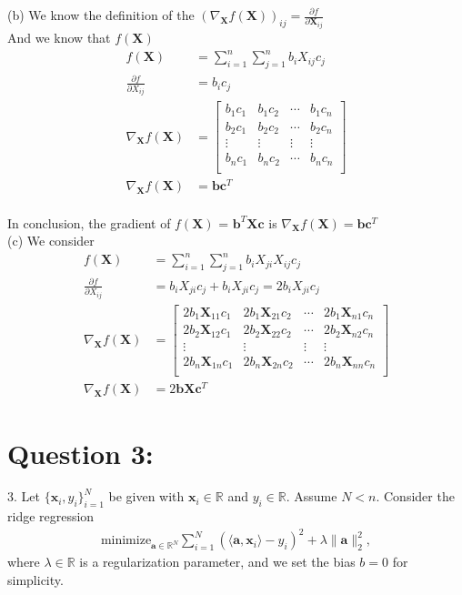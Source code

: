 \documentclass[a4paper,12pt]{article}
\newcommand{\R}{\mathbb{R}}
\begin{document}
(b) 
We know the definition of the \((\nabla_{\bm{X}} f(\bm{X}))_{ij} = \frac{\partial f}{\partial \bm{X}_{ij}} \) \\
And we know that \(f(\bm{X})\)
\begin{align*}
    f(\bm{X}) &= \sum_{i=1}^{n}\sum_{j=1}^{n} b_iX_{ij}c_j \\
    \frac{\partial f}{\partial X_{ij}} &= b_ic_j \\ 
    \nabla_{\bm{X}} f(\bm{X}) &= \begin{bmatrix}
        b_1c_1 & b_1c_2 & \cdots & b_1c_n \\
        b_2c_1 & b_2c_2 & \cdots & b_2c_n \\
        \vdots &\vdots & \vdots &\vdots \\
        b_nc_1 & b_nc_2 & \cdots & b_nc_n \\
    \end{bmatrix} \\
    \nabla_{\bm{X}} f(\bm{X}) &= \bm{b}\bm{c}^T
\end{align*} \\
In conclusion, the gradient of \(f(\bm{X})\) = \(\bm{b}^T\bm{X}\bm{c}\) is \(\nabla_{\bm{X}} f(\bm{X}) = \bm{b}\bm{c}^T\) \\

(c) We consider\\
\begin{align*}
    f(\bm{X}) &= \sum_{i=1}^{n}\sum_{j=1}^{n} b_iX_{ji}X_{ij}c_j \\
    \frac{\partial f}{\partial X_{ij}} &= b_iX_{ji}c_j + b_iX_{ji}c_j = 2b_iX_{ji}c_j    \\ 
    \nabla_{\bm{X}} f(\bm{X}) &= \begin{bmatrix}
        2b_1\bm{X}_{11}c_1 & 2b_1\bm{X}_{21}c_2 & \cdots & 2b_1\bm{X}_{n1}c_n \\
        2b_2\bm{X}_{12}c_1 & 2b_2\bm{X}_{22}c_2 & \cdots & 2b_2\bm{X}_{n2}c_n \\
        \vdots &\vdots & \vdots &\vdots \\
        2b_n\bm{X}_{1n}c_1 & 2b_n\bm{X}_{2n}c_2 & \cdots & 2b_n\bm{X}_{nn}c_n \\
    \end{bmatrix} \\
    \nabla_{\bm{X}} f(\bm{X}) &= 2\bm{b}\bm{X}\bm{c}^T
\end{align*}



\section*{Question 3:}
3. Let \(\{\bm{x}_i, y_i\}_{i = 1}^N\) be given with \(\bm{x}_i \in \R\) and \(y_i \in \R\). Assume \(N < n\). Consider the ridge regression \begin{align*}
    \text{minimize}_{\bm{a}\in\R^N} \sum_{i = 1}^N (\langle \bm{a}, \bm{x}_i\rangle - y_i)^2 + \lambda\|\bm{a}\|_2^2,
\end{align*}
where \(\lambda \in \R\) is a regularization parameter, and we set the bias \(b = 0\) for simplicity. \\
\end{document}
